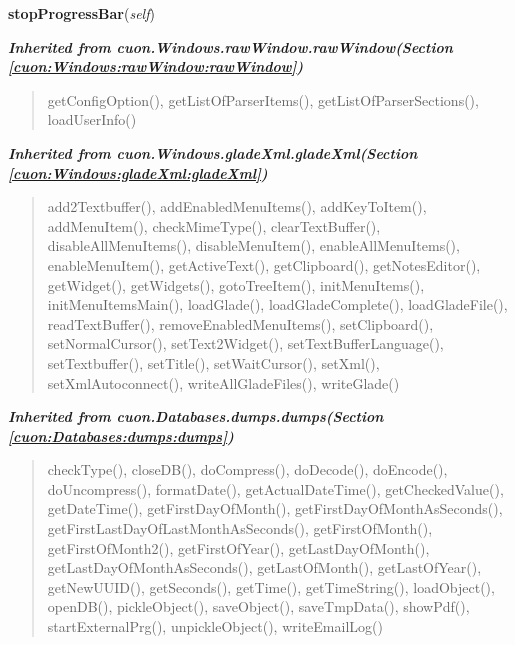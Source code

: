     \vspace{0.5ex}

\hspace{.8\funcindent}\begin{boxedminipage}{\funcwidth}

    \raggedright \textbf{stopProgressBar}(\textit{self})

\setlength{\parskip}{2ex}
\setlength{\parskip}{1ex}
    \end{boxedminipage}


\large{\textbf{\textit{Inherited from cuon.Windows.rawWindow.rawWindow\textit{(Section \ref{cuon:Windows:rawWindow:rawWindow})}}}}

\begin{quote}
getConfigOption(), getListOfParserItems(), getListOfParserSections(), loadUserInfo()
\end{quote}

\large{\textbf{\textit{Inherited from cuon.Windows.gladeXml.gladeXml\textit{(Section \ref{cuon:Windows:gladeXml:gladeXml})}}}}

\begin{quote}
add2Textbuffer(), addEnabledMenuItems(), addKeyToItem(), addMenuItem(), checkMimeType(), clearTextBuffer(), disableAllMenuItems(), disableMenuItem(), enableAllMenuItems(), enableMenuItem(), getActiveText(), getClipboard(), getNotesEditor(), getWidget(), getWidgets(), gotoTreeItem(), initMenuItems(), initMenuItemsMain(), loadGlade(), loadGladeComplete(), loadGladeFile(), readTextBuffer(), removeEnabledMenuItems(), setClipboard(), setNormalCursor(), setText2Widget(), setTextBufferLanguage(), setTextbuffer(), setTitle(), setWaitCursor(), setXml(), setXmlAutoconnect(), writeAllGladeFiles(), writeGlade()
\end{quote}

\large{\textbf{\textit{Inherited from cuon.Databases.dumps.dumps\textit{(Section \ref{cuon:Databases:dumps:dumps})}}}}

\begin{quote}
checkType(), closeDB(), doCompress(), doDecode(), doEncode(), doUncompress(), formatDate(), getActualDateTime(), getCheckedValue(), getDateTime(), getFirstDayOfMonth(), getFirstDayOfMonthAsSeconds(), getFirstLastDayOfLastMonthAsSeconds(), getFirstOfMonth(), getFirstOfMonth2(), getFirstOfYear(), getLastDayOfMonth(), getLastDayOfMonthAsSeconds(), getLastOfMonth(), getLastOfYear(), getNewUUID(), getSeconds(), getTime(), getTimeString(), loadObject(), openDB(), pickleObject(), saveObject(), saveTmpData(), showPdf(), startExternalPrg(), unpickleObject(), writeEmailLog()
\end{quote}


